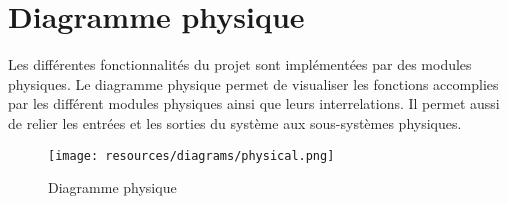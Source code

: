 \chapter{Diagramme physique}

Les différentes fonctionnalités du projet sont implémentées par des modules physiques. Le diagramme physique permet de visualiser les fonctions accomplies par les différent modules
physiques ainsi que leurs interrelations. Il permet aussi de relier les entrées et les sorties du système aux sous-systèmes physiques.

\begin{landscape}
\begin{figure}
  \centering
  \texttt{[image: resources/diagrams/physical.png]}
  \caption{Diagramme physique}
\end{figure}
\end{landscape}
